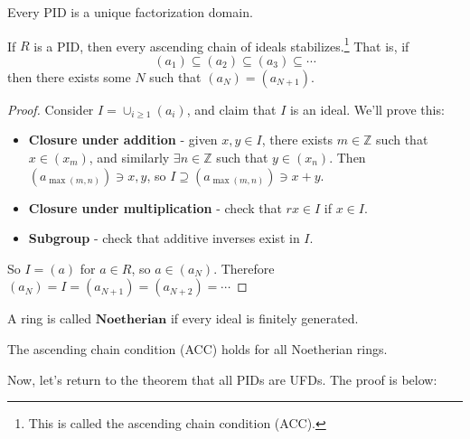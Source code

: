\documentclass{article}
\theoremstyle{plain}
\newcommand{\Z}{\mathbb{Z}}
\begin{document}
\begin{theorem}{}{}
Every PID is a unique factorization domain.	
\end{theorem}
\begin{lemma}{}{}
If $R$ is a PID, then every ascending chain of ideals stabilizes.\footnote{This is called the ascending chain condition (ACC).} That is, if 
	$$(a_1) \subseteq (a_2) \subseteq (a_3) \subseteq \cdots$$
then there exists some $N$ such that $(a_N) = (a_{N+1})$.	
\end{lemma}
\begin{proof}
Consider $I = \cup_{i \ge 1} (a_i)$, and claim that $I$ is an ideal. We'll prove this:
\begin{itemize}
\item \textbf{Closure under addition} - given $x,y \in I$, there exists $m \in \Z$ such that $x \in (x_m)$, and similarly $\exists n\in\Z$ such that $y \in (x_n)$. Then $(a_{\max(m,n)}) \ni x,y$, so $I \supseteq (a_{\max(m,n)}) \ni x+y$.
\item \textbf{Closure under multiplication} - check that $rx \in I$ if $x \in I$.
\item \textbf{Subgroup} - check that additive inverses exist in $I$.
\end{itemize}
So $I = (a)$ for $a \in R$, so $a \in (a_N)$. Therefore $(a_N) = I = (a_{N+1}) = (a_{N+2}) = \cdots$
\end{proof}
\begin{definition}{}{}
A ring is called $\textbf{Noetherian}$ if every ideal is finitely generated.	
\end{definition}
\begin{theorem}{}{}
The ascending chain condition (ACC) holds for all Noetherian rings.	%
\end{theorem}
Now, let's return to the theorem that all PIDs are UFDs. The proof is below:
\end{document}
